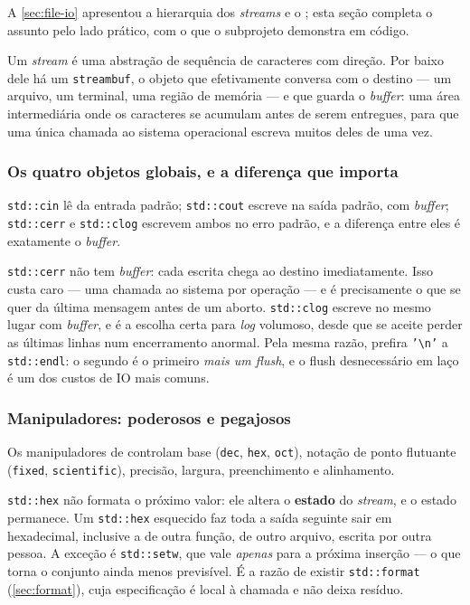 A \cref{sec:file-io} apresentou a hierarquia dos \emph{streams} e o
; esta seção completa o assunto pelo lado prático, com o
que o subprojeto  demonstra em código.

Um \emph{stream} é uma abstração de sequência de caracteres com direção. Por
baixo dele há um \texttt{streambuf}, o objeto que efetivamente conversa com o
destino --- um arquivo, um terminal, uma região de memória --- e que guarda o
\emph{buffer}: uma área intermediária onde os caracteres se acumulam antes de
serem entregues, para que uma única chamada ao sistema operacional escreva
muitos deles de uma vez.

\subsubsection{Os quatro objetos globais, e a diferença que importa}

\texttt{std::cin} lê da entrada padrão; \texttt{std::cout} escreve na saída
padrão, com \emph{buffer}; \texttt{std::cerr} e \texttt{std::clog} escrevem
ambos no erro padrão, e a diferença entre eles é exatamente o \emph{buffer}.

\begin{regra}
\texttt{std::cerr} não tem \emph{buffer}: cada escrita chega ao destino
imediatamente. Isso custa caro --- uma chamada ao sistema por operação --- e é
precisamente o que se quer da última mensagem antes de um aborto.
\texttt{std::clog} escreve no mesmo lugar com \emph{buffer}, e é a escolha certa
para \emph{log} volumoso, desde que se aceite perder as últimas linhas num
encerramento anormal. Pela mesma razão, prefira \texttt{'\textbackslash n'} a
\texttt{std::endl}: o segundo é o primeiro \emph{mais um flush}, e o flush
desnecessário em laço é um dos custos de IO mais comuns.
\end{regra}

\subsubsection{Manipuladores: poderosos e pegajosos}

Os manipuladores de  controlam base (\texttt{dec},
\texttt{hex}, \texttt{oct}), notação de ponto flutuante (\texttt{fixed},
\texttt{scientific}), precisão, largura, preenchimento e alinhamento.

\begin{armadilha}
\texttt{std::hex} não formata o próximo valor: ele altera o \textbf{estado} do
\emph{stream}, e o estado permanece. Um \texttt{std::hex} esquecido faz toda a
saída seguinte sair em hexadecimal, inclusive a de outra função, de outro
arquivo, escrita por outra pessoa. A exceção é \texttt{std::setw}, que vale
\emph{apenas} para a próxima inserção --- o que torna o conjunto ainda menos
previsível. É a razão de existir \texttt{std::format} (\cref{sec:format}), cuja
especificação é local à chamada e não deixa resíduo.
\end{armadilha}

